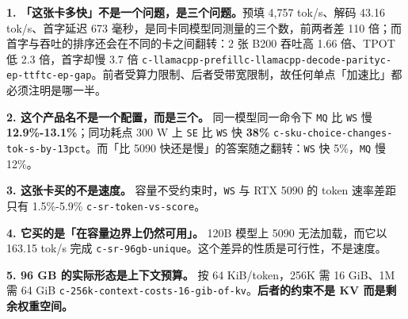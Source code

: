 \textbf{1. 「这张卡多快」不是一个问题，是三个问题。}预填 4,757 tok/s、解码 43.16 tok/s、首字延迟 673 毫秒，是同卡同模型同测量的三个数，前两者差 110 倍；而首字与吞吐的排序还会在不同的卡之间翻转：2 张 B200 吞吐高 1.66 倍、TPOT 低 2.3 倍，首字却慢 3.7 倍 {\scriptsize\texttt{c-\hspace{0pt}llamacpp-\hspace{0pt}prefill}}{\scriptsize\texttt{c-\hspace{0pt}llamacpp-\hspace{0pt}decode-\hspace{0pt}parity}}{\scriptsize\texttt{c-\hspace{0pt}ep-\hspace{0pt}ttft}}{\scriptsize\texttt{c-\hspace{0pt}ep-\hspace{0pt}gap}}。前者受算力限制、后者受带宽限制，故任何单点「加速比」都必须注明是哪一半。


\textbf{2. 这个产品名不是一个配置，而是三个。} 同一模型同一命令下 \texttt{MQ} 比 \texttt{WS} 慢 \textbf{12.9\%-\hspace{0pt}13.1\%}；同功耗点 300 W 上 \texttt{SE} 比 \texttt{WS} 快 \textbf{38\%} {\scriptsize\texttt{c-\hspace{0pt}sku-\hspace{0pt}choice-\hspace{0pt}changes-\hspace{0pt}tok-\hspace{0pt}s-\hspace{0pt}by-\hspace{0pt}13pct}}。而「比 5090 快还是慢」的答案随之翻转：\texttt{WS} 快 5\%，\texttt{MQ} 慢 12\%。


\textbf{3. 这张卡买的不是速度。} 容量不受约束时，\texttt{WS} 与 RTX 5090 的 token 速率差距只有 1.5\%-\hspace{0pt}5.9\% {\scriptsize\texttt{c-\hspace{0pt}sr-\hspace{0pt}token-\hspace{0pt}vs-\hspace{0pt}score}}。


\textbf{4. 它买的是「在容量边界上仍然可用」。} 120B 模型上 5090 无法加载，而它以 163.15 tok/s 完成 {\scriptsize\texttt{c-\hspace{0pt}sr-\hspace{0pt}96gb-\hspace{0pt}unique}}。这个差异的性质是可行性，不是速度。


\textbf{5. 96 GB 的实际形态是上下文预算。} 按 64 KiB/token，256K 需 16 GiB、1M 需 64 GiB {\scriptsize\texttt{c-\hspace{0pt}256k-\hspace{0pt}context-\hspace{0pt}costs-\hspace{0pt}16-\hspace{0pt}gib-\hspace{0pt}of-\hspace{0pt}kv}}。\textbf{后者的约束不是 KV 而是剩余权重空间。}


